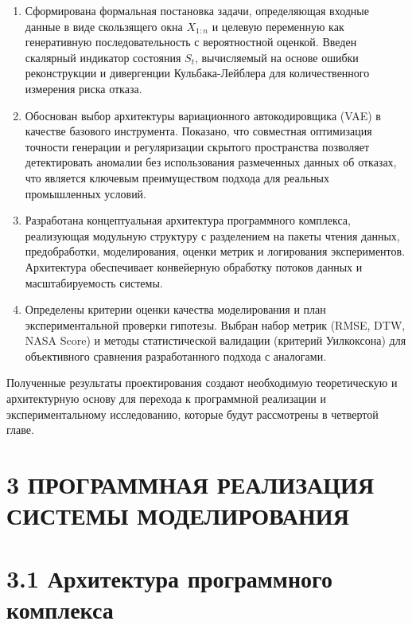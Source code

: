 \documentclass[14pt, a4paper, oneside]{extreport}
\begin{document}
\begin{enumerate}
\item Сформирована формальная постановка задачи, определяющая входные данные в виде скользящего окна $X_{1:n}$ и целевую переменную как генеративную последовательность с вероятностной оценкой. Введен скалярный индикатор состояния $S_t$, вычисляемый на основе ошибки реконструкции и дивергенции Кульбака-Лейблера для количественного измерения риска отказа.

\item Обоснован выбор архитектуры вариационного автокодировщика (VAE) в качестве базового инструмента. Показано, что совместная оптимизация точности генерации и регуляризации скрытого пространства позволяет детектировать аномалии без использования размеченных данных об отказах, что является ключевым преимуществом подхода для реальных промышленных условий.

\item Разработана концептуальная архитектура программного комплекса, реализующая модульную структуру с разделением на пакеты чтения данных, предобработки, моделирования, оценки метрик и логирования экспериментов. Архитектура обеспечивает конвейерную обработку потоков данных и масштабируемость системы.

\item Определены критерии оценки качества моделирования и план экспериментальной проверки гипотезы. Выбран набор метрик (RMSE, DTW, NASA Score) и методы статистической валидации (критерий Уилкоксона) для объективного сравнения разработанного подхода с аналогами.
\end{enumerate}

Полученные результаты проектирования создают необходимую теоретическую и архитектурную основу для перехода к программной реализации и экспериментальному исследованию, которые будут рассмотрены в четвертой главе.

\clearpage



\section{3 ПРОГРАММНАЯ РЕАЛИЗАЦИЯ СИСТЕМЫ МОДЕЛИРОВАНИЯ}
\section{3.1 Архитектура программного комплекса}
\vspace{1em}
\end{document}
